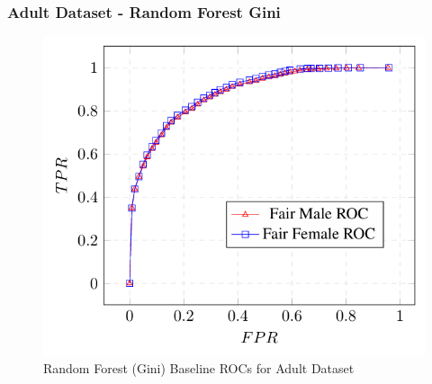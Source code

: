 \documentclass{article}
\begin{document}




\subsubsection{Adult Dataset - Random Forest Gini}

\begin{figure}[!h]
    \centering
    \includegraphics[width=1\linewidth]{Images/RFG_Adult_Baseline_ROC_FROC.png}
    \caption{Random Forest (Gini) Baseline ROCs for Adult Dataset}
    \label{fig:RFG_Adult_Baseline_ROC_FROC}
\end{figure}
\end{document}

